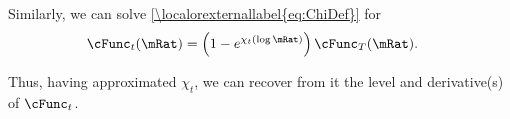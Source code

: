 \documentclass[\econtexRoot/BufferStockTheory.tex]{subfiles}
\begin{document}
\begin{comment} %
\begin{equation}\begin{gathered}\begin{aligned}
 \lim_{\mu \downarrow -\infty} \chi^{\prime}(\mu)  & = \left(\frac{-\left(\frac{\cFunc^{\prime}_{t}\cFunc_{T}^{\prime}\mRat-\cFunc_{t}^{\prime}\mRat\cFunc_{T}^{\prime}}{(\cFunc_{T}^{\prime}\mRat)^{2}}\mRat\right)}{(\cFunc_{T}^{\prime}\mRat-\cFunc_{t}^{\prime}\mRat)/\cFunc_{T}^{\prime}\mRat}\right)
\\  & = \left(\frac{-\left(\frac{\cFunc^{\prime}_{t}\cFunc_{T}^{\prime}-\cFunc_{t}^{\prime}\cFunc_{T}^{\prime}}{(\cFunc_{T}^{\prime})^{2}}\right)}{(\cFunc_{T}^{\prime}-\cFunc_{t}^{\prime})/\cFunc_{T}^{\prime}}\right)
\\  & = \left(\frac{-\left(\cFunc^{\prime}_{t}\cFunc_{T}^{\prime}-\cFunc_{t}^{\prime}\cFunc_{T}^{\prime}\right)}{(\cFunc_{T}^{\prime}-\cFunc_{t}^{\prime})\cFunc_{T}^{\prime}}\right)
\end{aligned}\end{gathered}\end{equation}
\end{comment}

Similarly, we can solve \eqref{\localorexternallabel{eq:ChiDef}} for
\begin{equation}\begin{gathered}\begin{aligned}
    \cFunc_{t}(\mRat)  & = \left(1-e^{\chi_{t}(\log \mRat)}\right)\cFunc_{T}(\mRat) \label{eq:cFuncFromChi}.
\end{aligned}\end{gathered}\end{equation}

Thus, having approximated $\chi_{t}$, we can recover from it
the level and derivative(s) of $\cFunc_{t}$.

\end{document}
